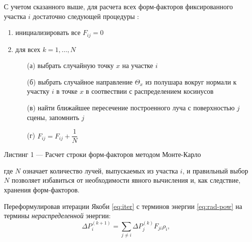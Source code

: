 \documentclass[12pt]{article}
\begin{document}
С учетом сказанного выше, для расчета всех форм-факторов фиксированного участка $i$ достаточно следующей процедуры \cite{Bek99}:
\begin{framed}
\begin{enumerate}
\item инициализировать все $F_{ij} = 0$
\item для всех $k = 1, \ldots, N$
\begin{enumerate}
    \item[(а)] выбрать случайную точку $x$ на участке $i$
    \item[(б)] выбрать случайное направление $\Theta_x$ из полушара вокруг нормали к участку $i$ в точке $x$ в соотвествии с распределением косинусов
    \item[(в)] найти ближайшее пересечение построенного луча с поверхностью $j$ сцены, запомнить $j$
    \item[(г)] $F_{ij} = F_{ij} + \dfrac{1}{N}$ 
\end{enumerate}
\end{enumerate}
\end{framed}
\begin{center}Листинг 1 --- Расчет строки форм-факторов методом Монте-Карло\end{center}

где $N$ означает количество лучей, выпускаемых из участка $i$, и правильный выбор $N$ позволяет избавиться от необходимости явного вычисления и, как следствие, хранения форм-факторов.

Переформулировав итерации Якоби \eqref{eq:iter} с терминов энергии \eqref{eq:rad-pow} на термины \emph{нераспределенной} энергии:
\begin{equation}
\Delta P_i^{(k+1)} = \sum_{j \neq i} \Delta P_j^{(k)} F_{ji} \rho_i, \label{eq:rad-pow-d}
\end{equation}
\end{document}
